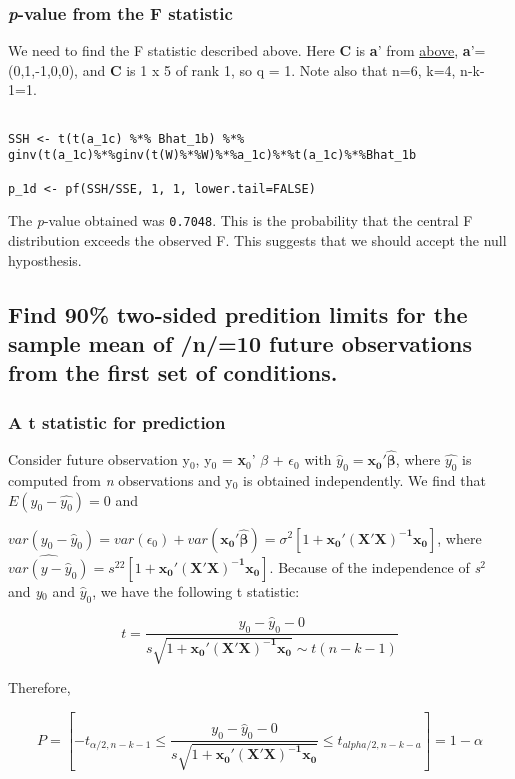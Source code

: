 \documentclass[11pt]{article}
\begin{document}
\subsubsection{\emph{p}-value from the F statistic}
\label{sec-1-4-2}


We need to find the F statistic described above. Here \textbf{C} is \textbf{a}' from \hyperref[Tau1Tau2]{above}, \textbf{a}'=(0,1,-1,0,0), and \textbf{C} is 1 x 5 of
rank 1, so q = 1. Note also that n=6, k=4, n-k-1=1.


\begin{verbatim}

SSH <- t(t(a_1c) %*% Bhat_1b) %*% ginv(t(a_1c)%*%ginv(t(W)%*%W)%*%a_1c)%*%t(a_1c)%*%Bhat_1b

p_1d <- pf(SSH/SSE, 1, 1, lower.tail=FALSE)
\end{verbatim}

The \emph{p}-value obtained was \texttt{0.7048}. This is the probability that the central F
distribution exceeds the observed F. This suggests that we should accept the null
hyposthesis.
\subsection{Find 90\% two-sided predition limits for the sample mean of /n/=10 future observations from the first set of conditions.}
\label{sec-1-5}
\subsubsection{A t statistic for prediction}
\label{sec-1-5-1}


Consider future observation y$_0$, y$_0$ = \textbf{x$_0$}' $\beta$ + $\epsilon$$_0$ with
$\hat{y}_0 = \mathbf{x_0'\hat{\beta}}$, where $\hat{y_0}$ is computed
from \emph{n} observations and y$_0$ is obtained independently. We find that
$E(y_0 - \hat{y_0}) = 0$ and 


$var(y_0 - \hat{y}_0) = var(\epsilon_0) +
var(\mathbf{x_0'\hat{\beta}}) = \sigma^2[1+
\mathbf{x_0'(X'X)^{-1}x_0}]$, where 
$\widehat{var(y - \hat{y}_0)} = s^22[1+ \mathbf{x_0'(X'X)^{-1}x_0}]$. Because of the independence of \emph{s$^2$}
and \emph{y$_0$} and $\hat{y}_0$, we have the following t statistic:

$$t = \frac{y_0 - \hat{y}_0 - 0}{s\sqrt{1+
\mathbf{x_0'(X'X)^{-1}x_0}} \sim t(n-k-1)}$$



Therefore,

$$P = \left[ -t_{\alpha/2,n-k-1} \leq \frac{y_0 - \hat{y}_0 - 0}{s\sqrt{1+
\mathbf{x_0'(X'X)^{-1}x_0}}} \leq t_{alpha/2,n-k-a}\right] = 1 -
\alpha$$
\end{document}
